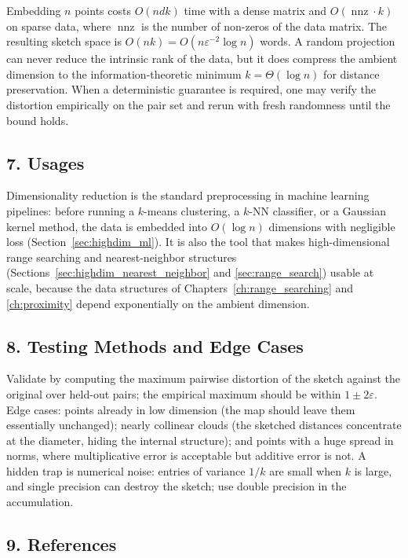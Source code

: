 Embedding $n$ points costs $O(n d k)$ time with a dense matrix and
$O(\operatorname{nnz} \cdot k)$ on sparse data, where
$\operatorname{nnz}$ is the number of non-zeros of the data matrix. The
resulting sketch space is $O(n k) = O(n \varepsilon^{-2} \log n)$ words. A
random projection can never reduce the intrinsic rank of the data, but it does
compress the ambient dimension to the information-theoretic minimum
$k = \Theta(\log n)$ for distance preservation. When a deterministic
guarantee is required, one may verify the distortion empirically on the pair
set and rerun with fresh randomness until the bound holds.

\subsection{7. Usages}

Dimensionality reduction is the standard preprocessing in machine learning
pipelines: before running a $k$-means clustering, a $k$-NN classifier, or a
Gaussian kernel method, the data is embedded into $O(\log n)$ dimensions with
negligible loss (Section~\ref{sec:highdim_ml}). It is also the tool that makes
high-dimensional range searching and nearest-neighbor structures
(Sections~\ref{sec:highdim_nearest_neighbor} and
\ref{sec:range_search}) usable at scale, because the data structures of
Chapters~\ref{ch:range_searching} and \ref{ch:proximity} depend exponentially
on the ambient dimension.

\subsection{8. Testing Methods and Edge Cases}

Validate by computing the maximum pairwise distortion of the sketch against
the original over held-out pairs; the empirical maximum should be within
$1 \pm 2\varepsilon$. Edge cases: points already in low dimension (the map
should leave them essentially unchanged); nearly collinear clouds (the
sketched distances concentrate at the diameter, hiding the internal
structure); and points with a huge spread in norms, where multiplicative
error is acceptable but additive error is not. A hidden trap is numerical
noise: entries of variance $1/k$ are small when $k$ is large, and single
precision can destroy the sketch; use double precision in the accumulation.

\subsection{9. References}

